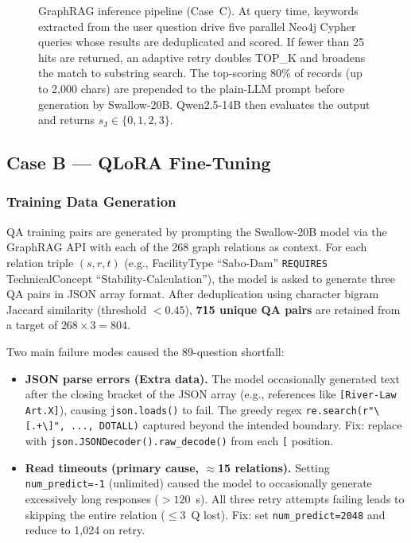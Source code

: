 \documentclass[twocolumn]{article}
\begin{document}
\begin{figure}[t]
  \caption{GraphRAG inference pipeline (Case~C).
    At query time, keywords extracted from the user question drive five parallel
    Neo4j Cypher queries whose results are deduplicated and scored.
    If fewer than 25 hits are returned, an adaptive retry doubles TOP\_K and
    broadens the match to substring search.
    The top-scoring 80\% of records (up to 2,000 chars) are prepended to the
    plain-LLM prompt before generation by Swallow-20B.
    Qwen2.5-14B then evaluates the output and returns $s_{\mathrm{J}} \in \{0,1,2,3\}$.}
  \label{fig:graphrag_flow}
\end{figure}

\subsection{Case B --- QLoRA Fine-Tuning}
\label{sec:case_b}

\subsubsection{Training Data Generation}
\label{sec:data_gen}

QA training pairs are generated by prompting the Swallow-20B model via the GraphRAG API
with each of the 268 graph relations as context.
For each relation triple $(s, r, t)$ (e.g., FacilityType ``Sabo-Dam'' \texttt{REQUIRES}
TechnicalConcept ``Stability-Calculation''), the model is asked to generate three QA pairs
in JSON array format.
After deduplication using character bigram Jaccard similarity (threshold $< 0.45$),
\textbf{715 unique QA pairs} are retained from a target of
$268 \times 3 = 804$.

Two main failure modes caused the 89-question shortfall:
\begin{itemize}
  \item \textbf{JSON parse errors (Extra data).}
        The model occasionally generated text after the closing bracket of the JSON array
        (e.g., references like \texttt{[River-Law Art.X]}), causing \texttt{json.loads()} to fail.
        The greedy regex \texttt{re.search(r"\textbackslash[.+\textbackslash]", ..., DOTALL)}
        captured beyond the intended boundary.
        Fix: replace with \texttt{json.JSONDecoder().raw\_decode()} from each \texttt{[} position.
  \item \textbf{Read timeouts (primary cause, $\approx$15 relations).}
        Setting \texttt{num\_predict=-1} (unlimited) caused the model to occasionally
        generate excessively long responses ($> 120$~s).
        All three retry attempts failing leads to skipping the entire relation ($\le 3$~Q lost).
        Fix: set \texttt{num\_predict=2048} and reduce to 1,024 on retry.
\end{itemize}
\end{document}

